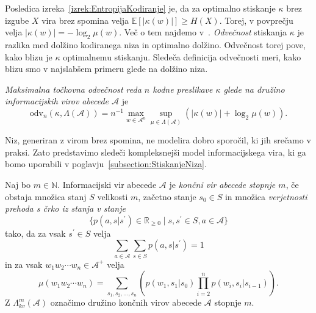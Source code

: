 \documentclass[fin1, tisk]{fmfdelo}
\providecommand{\abs}[1]{\left\lvert #1 \right\rvert}
\newcommand{\N}{\mathbb{N}}
\newcommand{\R}{\mathbb{R}}
\newcommand{\E}{\mathbb{E}}
\newcommand{\A}{\mathcal{A}}
\theoremstyle{definition}
\begin{document}
Posledica izreka~\ref{izrek:EntropijaKodiranje} je, da za optimalno stiskanje $\kappa$ brez 
izgube $X$ vira brez spomina velja $\E[\abs{\kappa(w)}] \geq H(X)$.
Torej, v povprečju velja $\abs{\kappa(w)} = - \log_2\mu(w)$. Več o tem najdemo 
v~\cite[1. poglavje, 5. razdelek]{Mackay2003}. \emph{Odvečnost} stiskanja $\kappa$
je razlika med dolžino kodiranega niza in optimalno dolžino. Odvečnost torej pove, kako
blizu je $\kappa$ optimalnemu stiskanju. Sledeča definicija odvečnosti meri, kako blizu smo
v najslabšem primeru glede na dolžino niza.

\begin{definicija}\label{def:odv}
    \emph{Maksimalna točkovna odvečnost reda $n$ kodne preslikave $\kappa$ glede na družino 
    informacijskih virov abecede $\A$} je
    \[
        \text{odv}_{n} \left( \kappa, \Lambda(\A) \right) = n^{-1} \max_{w \in \A^n} \sup_{\mu \in \Lambda(\A)}
        \left( \abs{\kappa(w)} + \log_2 \mu(w) \right).
    \]
\end{definicija}

Niz, generiran z virom brez spomina, ne modelira dobro sporočil, ki jih srečamo v
praksi. Zato predstavimo sledeči kompleksnejši model informacijskega vira, ki ga bomo uporabili
v poglavju~\ref{subsection:StiskanjeNiza}.

\begin{definicija}\label{def:FSS} %
    Naj bo $m \in \N$. Informacijski vir abecede $\A$ je 
    \emph{končni vir abecede stopnje $m$}, če obstaja množica stanj $S$ velikosti $m$, 
    začetno stanje $s_0 \in S$ in množica \emph{verjetnosti prehoda s črko iz stanja v stanje}
    \[
        \{ p(a, s|s^\prime) \in \R_{\geq 0} \mid s, s^\prime \in S, a \in \A \}
    \] 
    tako, da za vsak $s^\prime \in S$ velja
    \[
        \sum_{a \in \A} \sum_{s \in S} p(a, s|s^\prime) = 1
    \]
    in za vsak $w_1w_2 \cdots w_n \in \A^+$ velja
    \[
        \mu(w_1w_2 \cdots w_n) = \sum_{s_1, s_2, \ldots, s_n} 
        \left( p(w_1,s_1|s_0) \prod_{i=2}^{n} p(w_i, s_i|s_{i-1}) \right).
    \]
    Z $\Lambda_{kv}^m(\A)$ označimo družino končnih virov abecede $\A$ stopnje $m$.
\end{definicija}
\end{document}
